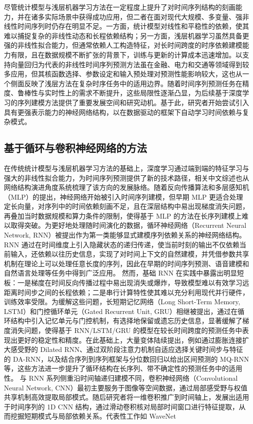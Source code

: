 尽管统计模型与浅层机器学习方法在一定程度上提升了对时间序列结构的刻画能力，并在诸多实际场景中获得成功应用，但二者在面对现代大规模、多变量、强非线性时间序列时仍存在明显不足。一方面，统计模型对线性和平稳性的依赖，使其难以捕捉复杂的非线性动态和长程依赖结构；另一方面，浅层机器学习虽然具备更强的非线性拟合能力，但通常依赖人工构造特征，对长时间跨度的时序依赖建模能力有限，且在数据规模不断扩张的背景下，训练与更新的计算成本迅速增加。以支持向量回归为代表的非线性时间序列预测方法虽在金融、电力和交通等领域得到较多应用，但其核函数选择、参数设定和输入预处理对预测性能影响较大，这也从一个侧面反映了浅层方法在复杂时序任务中的适用边界\cite{chen2013svrcn}。随着时间序列预测任务在精度、鲁棒性与实时性上的需求不断提升，这些局限性逐渐凸显，为后续基于深度学习的序列建模方法提供了重要发展空间和研究动机。基于此，研究者开始尝试引入具有更强表示能力的神经网络结构，以在数据驱动的框架下自动学习时间依赖与复杂模式。 \subsection{基于循环与卷积神经网络的方法} 在传统统计模型与浅层机器学习方法的基础上，深度学习通过端到端的特征学习与强大的非线性拟合能力，为时间序列预测提供了新的技术路径，相关中文综述也从网络结构演进角度系统梳理了该方向的发展脉络\cite{mao2023dltsfcn}。随着反向传播算法和多层感知机（MLP）的提出，神经网络开始被引入时间序列建模，但早期 MLP 更适合处理定长向量，对序列中的时间依赖刻画不足，且在深层结构中易出现梯度消失问题，再叠加当时数据规模和算力条件的限制，使得基于 MLP 的方法在长序列建模上难以取得突破\cite{rumelhart1986learning,bengio1994learning}。为更好地处理随时间演化的数据，循环神经网络（Recurrent Neural Network, RNN）被提出作为第一类能够显式建模序列依赖关系的神经网络结构。RNN 通过在时间维度上引入隐藏状态的递归传递，使当前时刻的输出不仅依赖当前输入，还依赖以往历史信息，实现了对时间上下文的自然建模，并凭借参数共享机制在理论上可以处理任意长度的序列，因此在早期的时间序列预测、语音建模和自然语言处理等任务中得到广泛应用。 然而，基础 RNN 在实践中暴露出明显短板：一是梯度在时间反向传播过程中易出现消失或爆炸，导致模型难以有效学习远距离时间步之间的长程依赖；二是串行计算特性使其难以充分利用现代并行硬件，训练效率受限。为缓解这些问题，长短期记忆网络（Long Short-Term Memory, LSTM）和门控循环单元（Gated Recurrent Unit, GRU）相继被提出，通过在循环结构中引入记忆单元与门控机制，有选择地保留或遗忘历史信息，显著缓解了梯度消失问题，使得基于 RNN/LSTM/GRU 的模型在较长时间跨度的预测任务中表现出更好的稳定性和精度\cite{cho2014learning}。在此基础上，大量变体陆续提出，例如通过膨胀连接扩大感受野的 Dilated RNN\cite{chang2017dilated}、通过双阶段注意力机制自适应选择关键时间步与特征的 DA-RNN，以及结合序列到序列框架与分位数回归以给出区间预测的 MQ-RNN 等\cite{qin2017dual,wen2017multi}，这些方法进一步提升了循环结构在长序列、带不确定性的预测任务中的适用性。 与 RNN 系列侧重沿时间轴递归建模不同，卷积神经网络（Convolutional Neural Network, CNN）最初主要服务于图像等空间数据，通过局部感受野与权值共享机制高效提取局部模式。随后研究者将一维卷积推广到时间轴上，发展出适用于时间序列的 1D CNN 结构，通过滑动卷积核对局部时间窗口进行特征提取，从而挖掘短期模式与局部依赖关系。代表性工作如 WaveNet 